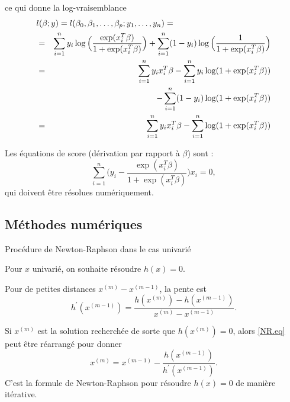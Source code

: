 \documentclass{BeamerTemplate}
\begin{document}
\begin{refsection}
\begin{frame}{}
ce qui donne la log-vraisemblance
\begin{eqnarray*}
 \lefteqn{l(\beta;y)=l(\beta_0, \beta_1,\ldots,\beta_p; y_1, \ldots, y_n)=}\\
& = &  \sum_{i=1}^n y_i \log \Big(\frac{\exp(x_i^T \beta)}{1+\exp(x_i^T
  \beta)} \Big) +  \sum_{i=1}^n (1-y_i) \log\Big(\frac{1}{1+\exp(x_i^T \beta)} \Big) \\
& = &  \sum_{i=1}^n y_i x_i^T \beta -  \sum_{i=1}^n y_i \log( 1 +
\exp(x_i^T \beta)) \\
& & - \sum_{i=1}^n (1-y_i) \log(1+\exp(x_i^T \beta))\\
& = & \sum_{i=1}^n y_i x_i^T \beta - \sum_{i=1}^n \log(1+\exp(x_i^T \beta))
\end{eqnarray*}
\end{frame}

\begin{frame}{}

Les équations de score (dérivation par rapport à $\beta$) sont :
$$\sum_{i=1}^n \Big(y_i  - \frac{\exp(x_i^T \beta)}{1+\exp(x_i^T
  \beta)} \Big)   x_i = 0,$$
qui doivent être résolues numériquement.

\end{frame}

\subsection{Méthodes numériques}
\begin{frame}{Procédure de Newton-Raphson dans le cas univarié}

Pour $x$ univarié, on souhaite résoudre $h(x)=0.$

\bigskip

Pour de petites distances $x^{(m)} - x^{(m-1)}$, la pente est
\begin{equation}
  \label{NR.eq}
 h^{\prime}(x^{(m-1)}) = \frac{h(x^{(m)})-h(x^{(m-1)})}{x^{(m)} - x^{(m-1)}}.
\end{equation}

\bigskip
Si $x^{(m)}$ est la solution recherchée de sorte que $h(x^{(m)})=0$, alors
\eqref{NR.eq} peut être réarrangé pour donner
\begin{equation}
  \label{NRformula}
  x^{(m)} = x^{(m-1)} - \frac{h(x^{(m-1)})}{h^{\prime}(x^{(m-1)})}.
\end{equation}
C'est la formule de Newton-Raphson pour résoudre $h(x)=0$ de manière itérative.
\label{Ufct}
\end{frame}


\end{refsection}
\end{document}
